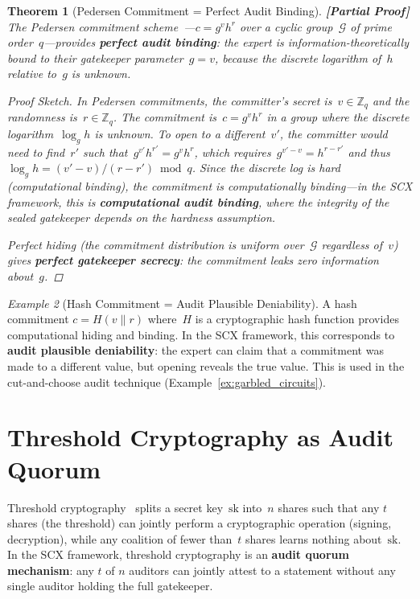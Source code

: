 \documentclass[12pt,a4paper]{article}
\newtheorem{theorem}{Theorem}[section]
\theoremstyle{remark}
\newtheorem{example}[theorem]{Example}
\newcommand{\Zbb}{\mathbb{Z}}
\newcommand{\G}{\mathcal{G}}
\newcommand{\SCX}{\textsf{SCX}}
\newcommand{\rigorPartial}{\textbf{[Partial Proof]}}
\begin{document}
\begin{theorem}[Pedersen Commitment = Perfect Audit Binding]
\label{thm:pedersen}
\rigorPartial
The Pedersen commitment scheme~\cite{pedersen1991non}---$c = g^v h^r$ over a cyclic group~$\G$ of prime order~$q$---provides \textbf{perfect audit binding}: the expert is information-theoretically bound to their gatekeeper parameter~$g = v$, because the discrete logarithm of~$h$ relative to~$g$ is unknown.

\begin{proof}[Proof Sketch]
In Pedersen commitments, the committer's secret is~$v \in \Zbb_q$ and the randomness is~$r \in \Zbb_q$. The commitment is~$c = g^v h^r$ in a group where the discrete logarithm~$\log_g h$ is unknown. To open to a different~$v'$, the committer would need to find~$r'$ such that~$g^{v'} h^{r'} = g^v h^r$, which requires~$g^{v'-v} = h^{r-r'}$ and thus~$\log_g h = (v'-v)/(r-r') \bmod q$. Since the discrete log is hard (computational binding), the commitment is computationally binding---in the \SCX{} framework, this is \textbf{computational audit binding}, where the integrity of the sealed gatekeeper depends on the hardness assumption.

Perfect hiding (the commitment distribution is uniform over~$\G$ regardless of~$v$) gives \textbf{perfect gatekeeper secrecy}: the commitment leaks zero information about~$g$.
\end{proof}
\end{theorem}

\begin{example}[Hash Commitment = Audit Plausible Deniability]
\label{ex:hash_commit}
A hash commitment $c = H(v \| r)$ where~$H$ is a cryptographic hash function provides computational hiding and binding. In the \SCX{} framework, this corresponds to \textbf{audit plausible deniability}: the expert can claim that a commitment was made to a different value, but opening reveals the true value. This is used in the cut-and-choose audit technique (Example~\ref{ex:garbled_circuits}).
\end{example}


\section{Threshold Cryptography as Audit Quorum}
\label{sec:threshold}

Threshold cryptography~\cite{desmedt1988threshold,shamir1979share} splits a secret key~$\text{sk}$ into~$n$ shares such that any $t$ shares (the threshold) can jointly perform a cryptographic operation (signing, decryption), while any coalition of fewer than~$t$ shares learns nothing about~$\text{sk}$. In the \SCX{} framework, threshold cryptography is an \textbf{audit quorum mechanism}: any $t$ of $n$ auditors can jointly attest to a statement without any single auditor holding the full gatekeeper.
\end{document}
